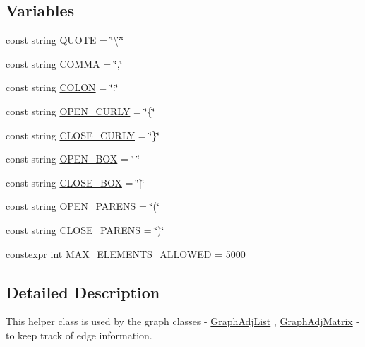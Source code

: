\subsection*{Variables}
\begin{DoxyCompactItemize}
\item 
const string \hyperlink{namespacebridges_acd8357e88562cbb7e60bea3fac422ac3}{Q\+U\+O\+T\+E} = \char`\"{}\textbackslash{}\char`\"{}\char`\"{}
\item 
const string \hyperlink{namespacebridges_a74087afbaa635d3c3d837cc3b44c0162}{C\+O\+M\+M\+A} = \char`\"{},\char`\"{}
\item 
const string \hyperlink{namespacebridges_a039dca813ca3a9b4c8d8a866c6fa8445}{C\+O\+L\+O\+N} = \char`\"{}\+:\char`\"{}
\item 
const string \hyperlink{namespacebridges_a9bef552535e3f5bbfc2ca586cb5044c6}{O\+P\+E\+N\+\_\+\+C\+U\+R\+L\+Y} = \char`\"{}\{\char`\"{}
\item 
const string \hyperlink{namespacebridges_aa0d8f65415cfe7cdca23401137d40ca9}{C\+L\+O\+S\+E\+\_\+\+C\+U\+R\+L\+Y} = \char`\"{}\}\char`\"{}
\item 
const string \hyperlink{namespacebridges_a6b481335016325fe202a4e2fedd0af14}{O\+P\+E\+N\+\_\+\+B\+O\+X} = \char`\"{}\mbox{[}\char`\"{}
\item 
const string \hyperlink{namespacebridges_a9cbd20a3f223f32670280b954061f274}{C\+L\+O\+S\+E\+\_\+\+B\+O\+X} = \char`\"{}\mbox{]}\char`\"{}
\item 
const string \hyperlink{namespacebridges_ad909fb43b05ef6b7271fddbe85e2742a}{O\+P\+E\+N\+\_\+\+P\+A\+R\+E\+N\+S} = \char`\"{}(\char`\"{}
\item 
const string \hyperlink{namespacebridges_aff509a0d23b28c17004b1efd5a0a5920}{C\+L\+O\+S\+E\+\_\+\+P\+A\+R\+E\+N\+S} = \char`\"{})\char`\"{}
\item 
constexpr int \hyperlink{namespacebridges_adc32aeee3ab880d297758a6d6200188f}{M\+A\+X\+\_\+\+E\+L\+E\+M\+E\+N\+T\+S\+\_\+\+A\+L\+L\+O\+W\+E\+D} = 5000
\end{DoxyCompactItemize}


\subsection{Detailed Description}
This helper class is used by the graph classes -\/ \hyperlink{classbridges_1_1_graph_adj_list}{Graph\+Adj\+List} , \hyperlink{classbridges_1_1_graph_adj_matrix}{Graph\+Adj\+Matrix} -\/ to keep track of edge information. 

